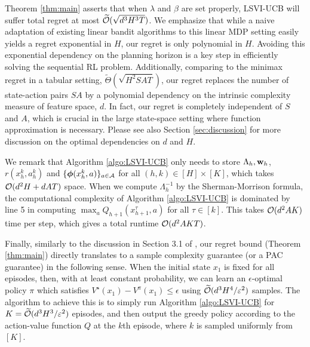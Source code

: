 Theorem \ref{thm:main} asserts that when $\lambda$ and $\beta$ are set properly, LSVI-UCB will suffer total regret at most $\widetilde{\mathcal{O}}(\sqrt{ d^3 H ^3 T })$. We emphasize that while a naive adaptation of existing linear bandit algorithms to this linear MDP setting easily yields a regret exponential in $H$, our regret is only polynomial in $H$. Avoiding this exponential dependency on the planning horizon is a key step in efficiently solving the sequential RL problem. Additionally, comparing to the minimax regret in a tabular setting, $\tilde{\Theta}(\sqrt{H^2SAT})$, our regret replaces the number of state-action pairs $SA$ by a polynomial dependency on the intrinsic complexity measure of feature space, $d$. In fact, our regret is completely independent of $S$ and $A$, which is crucial in the large state-space setting where function approximation is necessary. Please see also Section \ref{sec:discussion} for more discussion on the optimal dependencies on $d$ and $H$.


We remark that Algorithm \ref{algo:LSVI-UCB} only needs to store $\Lambda_h, \mathbf{w}_h$, $r(x_h^k, a_h^k)$ and $\{\bm{\phi}(x_{h}^k, a)\}_{a\in\mathcal{A}}$ for all $(h, k)\in [H]\times[K]$, which takes $\mathcal{O}(d^2H + dAT)$ space. When we compute $\Lambda_h^{-1}$ by the Sherman-Morrison formula, the computational complexity of Algorithm \ref{algo:LSVI-UCB} is dominated by line 5 in computing $\max_a Q_{h+1}(x^{\tau}_{h+1}, a)$ for all $\tau \in [k]$. This takes $\mathcal{O}(d^2 A K)$ time per step, which gives a total runtime $\mathcal{O}(d^2 AKT)$.


Finally, similarly to the discussion in Section 3.1 of \cite{jin2018q}, our regret bound (Theorem \ref{thm:main}) directly translates to a sample complexity guarantee (or a PAC guarantee) in the following sense. When the initial state $x_1$ is fixed for all episodes, then, with at least constant probability, we can learn an $\epsilon$-optimal policy $\pi$ which satisfies $V^\star (x_1) - V^\pi (x_1 ) \leq \epsilon$ using $\widetilde{\mathcal{O}}(d^3H^4/\varepsilon^2)$ samples. The algorithm to achieve this is to simply run Algorithm \ref{algo:LSVI-UCB} for $K=\widetilde{\mathcal{O}}(d^3H^3/\varepsilon^2)$ episodes, and then output the greedy policy according to the action-value function $Q$ at the $k$th episode, where $k$ is sampled uniformly from $[K]$.

